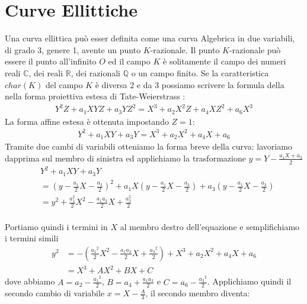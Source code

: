 \documentclass[a4paper,12pt]{tesiinfo}
\newcommand\ddfrac[2]{\frac{\displaystyle #1}{\displaystyle #2}}
\begin{document}
\chapter{Curve Ellittiche}
Una curva ellittica pu\`o esser definita come una curva Algebrica in due variabili, di grado 3, genere 1, avente un punto $K$-razionale. Il punto $K$-razionale pu\`o essere il punto all'infinito $O$ ed il campo $K$ \`e solitamente il campo dei numeri reali $\mathbb{C}$, dei reali $\mathbb{R}$, dei razionali $\mathbb{Q}$ o un campo finito. Se la caratteristica $char(K)$ del campo $K$ \`e diversa 2 e da 3 possiamo scrivere la formula della nella forma proiettiva estesa di Tate-Weierstrass :
\begin{gather}
Y^{2}Z + a_1XYZ + a_3YZ^2 =X^3 + a_2X^2Z + a_4XZ^2 + a_6X^3
\end{gather}
La forma affine estesa \`e ottenuta impostando $Z=1$: 
\begin{gather}
Y^{2} + a_1XY + a_3Y =X^3 + a_2X^2 + a_4X + a_6
\end{gather}
Tramite due cambi di variabili otteniamo la forma breve della curva: lavoriamo dapprima sul membro di sinistra ed applichiamo la trasformazione $y = Y - \ddfrac{a_1X + a_3}{2}$
\begin{align*}
&Y^{2} + a_1XY + a_3Y  
\\ 
&= \left ( y - \ddfrac{a_1}{2}X - \ddfrac{a_3}{2} \right )^2 + a_1X \left ( y - \ddfrac{a_1}{2}X - \ddfrac{a_3}{2} \right ) + a_3 \left ( y - \ddfrac{a_1}{2}X - \ddfrac{a_3}{2} \right ) 
\\
&= y^2 + \ddfrac{a_1^2}{2}X^2 - \ddfrac{a_1a_3}{2}X +\ddfrac{a_3^2}{2} 
\end{align*}
\\
Portiamo quindi i termini in $X$ al membro destro dell'equazione e semplifichiamo i termini simili
\begin{align*}
y^2 &= - \left ( \ddfrac{{a_1}^2}{2}X^2 - \ddfrac{a_1a_3}{2}X +\ddfrac{{a_3}^2}{2} \right ) + X^3 + a_2X^2 + a_4X + a_6
\\
&= X^3 + AX^2 + BX + C 
\end{align*}
dove abbiamo $A = a_2 - \ddfrac{{a_1}^2}{2}$, $B = a_4 + \ddfrac{a_1a_3}{2}$ e $C = a_6 - \ddfrac{{a_3}^2}{2}$.
Applichiamo quindi il secondo cambio di variabile $x = X - \ddfrac{A}{3}$, il secondo membro diventa:
\end{document}
